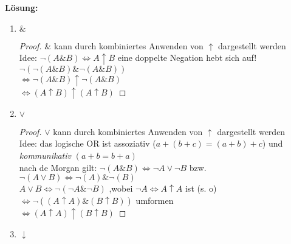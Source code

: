 \documentclass[paper=a4,fontsize=11pt]{scrartcl}%
\numberwithin{equation}{section}
\newenvironment{solution}
	{
		\color{Blue}
		\textbf{Lösung:}
	}{}
\begin{document}
\begin{enumerate}
\begin{solution}
	\begin{enumerate}
\item $\&$
\begin{proof}
$\&$ kann durch kombiniertes Anwenden von $\uparrow$ dargestellt werden\\
Idee: $ \neg (A \& B) \Leftrightarrow A \uparrow B $ eine doppelte Negation hebt sich auf!\\
$ \neg (\neg (A \& B) \& \neg (A \& B))$\\
$ \Leftrightarrow \neg (A \& B) \uparrow \neg (A \& B)$\\
$ \Leftrightarrow (A \uparrow B) \uparrow (A \uparrow B)$
\end{proof}
\item $\lor$
\begin{proof}
$\lor$ kann durch kombiniertes Anwenden von $\uparrow$ dargestellt werden\\
Idee: das logische OR ist assoziativ ($a+(b+c)=(a+b)+c$) und \textit{kommunikativ} $(a + b = b +a)$ \\ 
nach de Morgan gilt: $\neg(A \& B) \Leftrightarrow \neg A \lor \neg B$ bzw. $\neg (A \lor B) \Leftrightarrow \neg (A) \& \neg(B) $\\
$A \lor B \Leftrightarrow \neg (\neg A \& \neg B)$ ,wobei $\neg A \Leftrightarrow A \uparrow A$ ist (s. o)\\
$ \Leftrightarrow \neg((A \uparrow A) \& (B \uparrow B))$ umformen\\
$ \Leftrightarrow (A \uparrow A) \uparrow (B \uparrow B)$ 
\end{proof}
\item $\downarrow$


\end{enumerate}
\end{solution}
\end{enumerate}
\end{document}
